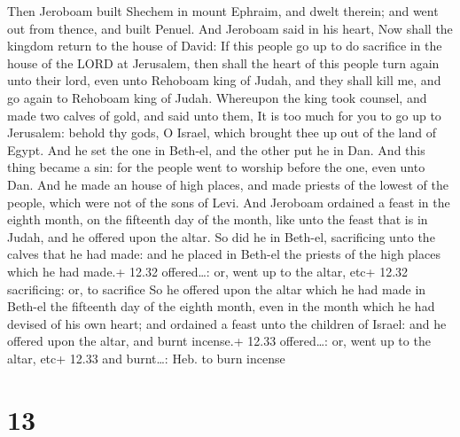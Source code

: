 Then Jeroboam built Shechem in mount Ephraim, and dwelt
therein; and went out from thence, and built Penuel.  And
Jeroboam said in his heart, Now shall the kingdom return to the house of
David:  If this people go up to do sacrifice in the house
of the LORD at Jerusalem, then shall the heart of this people turn again
unto their lord, even unto Rehoboam king of Judah, and they shall kill
me, and go again to Rehoboam king of Judah.  Whereupon the
king took counsel, and made two calves of gold, and said unto them, It
is too much for you to go up to Jerusalem: behold thy gods, O Israel,
which brought thee up out of the land of Egypt.  And he set
the one in Beth-el, and the other put he in Dan.  And this
thing became a sin: for the people went to worship before the one, even
unto Dan.  And he made an house of high places, and made
priests of the lowest of the people, which were not of the sons of Levi.
 And Jeroboam ordained a feast in the eighth month, on the
fifteenth day of the month, like unto the feast that is in Judah, and he
offered upon the altar. So did he in Beth-el, sacrificing unto the
calves that he had made: and he placed in Beth-el the priests of the
high places which he had made.+ 12.32 offered\ldots: or, went up to the
altar, etc+ 12.32 sacrificing: or, to sacrifice  So he
offered upon the altar which he had made in Beth-el the fifteenth day of
the eighth month, even in the month which he had devised of his own
heart; and ordained a feast unto the children of Israel: and he offered
upon the altar, and burnt incense.+ 12.33 offered\ldots: or, went up to
the altar, etc+ 12.33 and burnt\ldots: Heb. to burn incense

\hypertarget{section-12}{%
\section{13}\label{section-12}}

